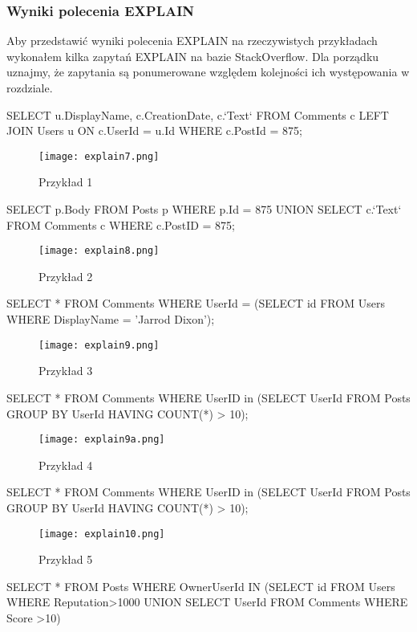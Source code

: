 \subsubsection{Wyniki polecenia EXPLAIN}
Aby przedstawić wyniki polecenia EXPLAIN na rzeczywistych przykładach wykonałem kilka zapytań EXPLAIN na bazie StackOverflow. Dla porządku uznajmy, że zapytania są ponumerowane względem kolejności ich występowania w rozdziale.
\begin{spverbatim}
	SELECT u.DisplayName, c.CreationDate, c.`Text` FROM  Comments c LEFT JOIN Users u ON c.UserId = u.Id WHERE c.PostId = 875;
\end{spverbatim}
\begin{figure}[H]
	\texttt{[image: explain7.png]} 
	\caption{Przykład 1}
\end{figure}
\begin{spverbatim}
	SELECT p.Body FROM Posts p WHERE p.Id = 875 UNION
	SELECT c.`Text` FROM Comments c WHERE c.PostID = 875;
\end{spverbatim}
\begin{figure}[H]
	\texttt{[image: explain8.png]} 
	\caption{Przykład 2}
\end{figure}
\begin{spverbatim}
	SELECT * FROM Comments WHERE UserId = (SELECT id FROM Users WHERE DisplayName = 'Jarrod Dixon');
\end{spverbatim}
\begin{figure}[H]
	\texttt{[image: explain9.png]} 
	\caption{Przykład 3}
\end{figure}
\begin{spverbatim}
	SELECT * FROM Comments WHERE UserID in (SELECT UserId FROM Posts GROUP BY UserId HAVING COUNT(*) > 10);
\end{spverbatim}
\begin{figure}[H]
	\texttt{[image: explain9a.png]} 
	\caption{Przykład 4}
\end{figure}
\begin{spverbatim}
	SELECT * FROM Comments WHERE UserID in (SELECT UserId FROM Posts GROUP BY UserId HAVING COUNT(*) > 10);
\end{spverbatim}
\begin{figure}[H]
	\texttt{[image: explain10.png]} 
	\caption{Przykład 5}
\end{figure}
\begin{spverbatim}
	SELECT * FROM Posts  WHERE OwnerUserId IN (SELECT id FROM Users WHERE Reputation>1000 UNION SELECT UserId FROM Comments WHERE Score >10)
\end{spverbatim}
